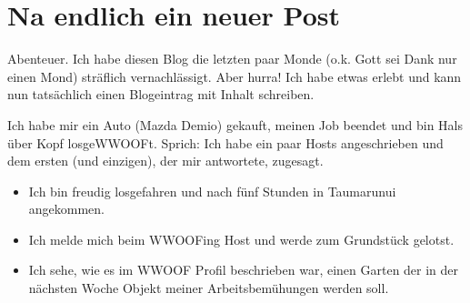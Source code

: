 \chapter{Na endlich ein neuer Post}

Abenteuer. Ich habe diesen Blog die letzten paar Monde (o.k. Gott sei
Dank nur einen Mond) sträflich vernachlässigt. Aber hurra! Ich habe
etwas erlebt und kann nun tatsächlich einen Blogeintrag mit Inhalt
schreiben.

Ich habe mir ein Auto (Mazda Demio) gekauft, meinen Job beendet und bin
Hals über Kopf losgeWWOOFt. Sprich: Ich habe ein paar Hosts
angeschrieben und dem ersten (und einzigen), der mir antwortete,
zugesagt.

\begin{itemize}
\tightlist
\item
  Ich bin freudig losgefahren und nach fünf Stunden in Taumarunui
  angekommen.
\item
  Ich melde mich beim WWOOFing Host und werde zum Grundstück gelotst.
\item
  Ich sehe, wie es im WWOOF Profil beschrieben war, einen Garten der in
  der nächsten Woche Objekt meiner Arbeitsbemühungen werden soll.
\end{itemize}

